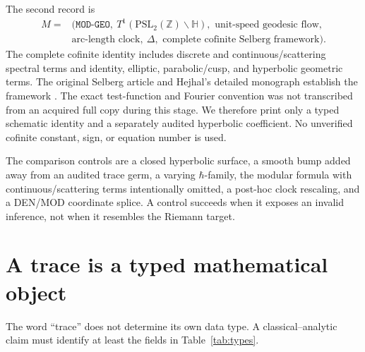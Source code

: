 \documentclass[11pt]{article}
\theoremstyle{definition}
\theoremstyle{remark}
\newcommand{\Z}{\mathbb{Z}}
\begin{document}
The second record is
\begin{equation*}
\begin{aligned}
 M={}&(\texttt{MOD-GEO},\ T^1(\mathrm{PSL}_2(\Z)\backslash\mathbb H),
 \text{ unit-speed geodesic flow},\\
 &\text{arc-length clock},\ \Delta,\text{ complete cofinite Selberg framework}).
\end{aligned}
\end{equation*}
The complete cofinite identity includes discrete and continuous/scattering
spectral terms and identity, elliptic, parabolic/cusp, and hyperbolic geometric
terms.  The original Selberg article and Hejhal's detailed monograph establish
the framework \citep{Selberg1956,Hejhal1983}.  The exact test-function and
Fourier convention was not transcribed from an acquired full copy during this
stage.  We therefore print only a typed schematic identity and a separately
audited hyperbolic coefficient.  No unverified cofinite constant, sign, or
equation number is used.

The comparison controls are a closed hyperbolic surface, a smooth bump added
away from an audited trace germ, a varying \(\hbar\)-family, the modular
formula with continuous/scattering terms intentionally omitted, a post-hoc
clock rescaling, and a DEN/MOD coordinate splice.  A control succeeds when it
exposes an invalid inference, not when it resembles the Riemann target.

\section{A trace is a typed mathematical object}
\label{sec:types}

The word ``trace'' does not determine its own data type.  A classical--analytic
claim must identify at least the fields in Table~\ref{tab:types}.
\end{document}
